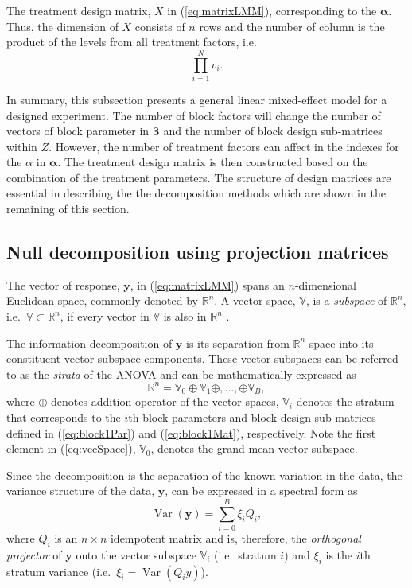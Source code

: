 \documentclass[article]{jss}
\begin{document}
The treatment design matrix, $X$ in (\ref{eq:matrixLMM}), corresponding to the $\bm{\alpha}$. Thus, the dimension of $X$ consists of $n$ rows and the number of column is the product of the levels from all treatment factors, i.e.\
\[
\prod^{N}_{i = 1} v_i.
\]

In summary, this subsection presents a general linear mixed-effect model for a designed experiment. The number of block factors will change the number of vectors of block parameter in $\bm{\beta}$ and the number of block design sub-matrices within $Z$. However, the number of treatment factors can affect in the indexes for the $\alpha$ in $\bm{\alpha}$. The treatment design matrix is then constructed based on the combination of the treatment parameters. The structure of design matrices are essential in describing the the decomposition methods which are shown in the remaining of this section.  
 
\subsection{Null decomposition using projection matrices}
\label{subsec:strataDecompProj}
The vector of response, $\bm{y}$, in (\ref{eq:matrixLMM}) spans an $n$-dimensional Euclidean space, commonly denoted by $\mathbb{R}^n$. A vector space, $\mathbb{V}$, is a \emph{subspace} of $\mathbb{R}^n$, i.e.\ $\mathbb{V} \subset \mathbb{R}^n$, if every vector in $\mathbb{V}$ is also in $\mathbb{R}^n$ \citep{Hadi1996}. 

The information decomposition of $\bm{y}$ is its separation from $\mathbb{R}^n$ space into its constituent vector subspace components. These vector subspaces can be referred to as the \emph{strata} of the ANOVA and can be mathematically expressed as 
\begin{equation}
\label{eq:vecSpace}
\mathbb{R}^n = \mathbb{V}_0 \oplus \mathbb{V}_1 \oplus, \dots , \oplus \mathbb{V}_{B},
\end{equation} 
where $\oplus$ denotes addition operator of the vector spaces, $\mathbb{V}_i$ denotes the stratum that corresponds to the $i$th block parameters and block design sub-matrices defined in (\ref{eq:block1Par}) and (\ref{eq:block1Mat}), respectively. Note the first element in (\ref{eq:vecSpace}), $\mathbb{V}_0$, denotes the grand mean vector subspace.  

Since the decomposition is the separation of the known variation in the data, the variance structure of the data, $\bm{y}$, can be expressed in a spectral form as
\begin{equation}
\label{eq:strata}
\operatorname{Var}(\bm{y}) = \sum_{i=0}^{B} \xi_i Q_i,
\end{equation}
where $Q_i$ is an $n \times n$ idempotent matrix and is, therefore, the \emph{orthogonal projector} of $\bm{y}$ onto the vector subspace  $\mathbb{V}_i$ (i.e.\ stratum $i$) and $\xi_i$ is the $i$th stratum variance (i.e.\ $\xi_i = \operatorname{Var}(Q_i y)$).
\end{document}
